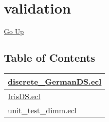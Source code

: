 \chapter*{\color{headtoc} validation}
\hypertarget{ecldoc:toc:root/validation}{}
\hyperlink{ecldoc:toc:root}{Go Up}


\section*{Table of Contents}
{\renewcommand{\arraystretch}{1.5}
\begin{longtable}{|p{\textwidth}|}
\hline
\hyperlink{ecldoc:toc:validation.discrete_GermanDS}{discrete\_GermanDS.ecl} \\
\hline
\hyperlink{ecldoc:toc:validation.IrisDS}{IrisDS.ecl} \\
\hline
\hyperlink{ecldoc:toc:validation.unit_test_dimm}{unit\_test\_dimm.ecl} \\
\hline
\end{longtable}
}




